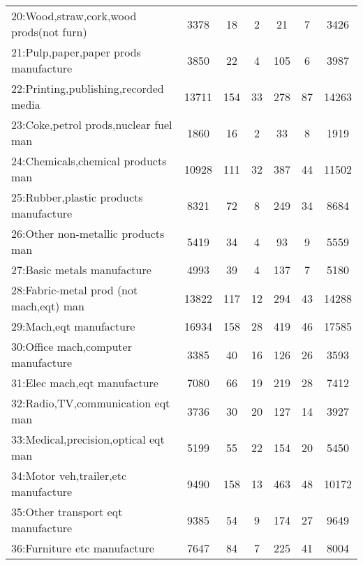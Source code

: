 {\begin{tabular}{l*{6}{c}}
20:Wood,straw,cork,wood prods(not furn)&        3378&          18&           2&          21&           7&        3426\\
21:Pulp,paper,paper prods manufacture&        3850&          22&           4&         105&           6&        3987\\
22:Printing,publishing,recorded media&       13711&         154&          33&         278&          87&       14263\\
23:Coke,petrol prods,nuclear fuel man&        1860&          16&           2&          33&           8&        1919\\
24:Chemicals,chemical products man&       10928&         111&          32&         387&          44&       11502\\
25:Rubber,plastic products manufacture&        8321&          72&           8&         249&          34&        8684\\
26:Other non-metallic products man&        5419&          34&           4&          93&           9&        5559\\
27:Basic metals manufacture&        4993&          39&           4&         137&           7&        5180\\
28:Fabric-metal prod (not mach,eqt) man&       13822&         117&          12&         294&          43&       14288\\
29:Mach,eqt manufacture&       16934&         158&          28&         419&          46&       17585\\
30:Office mach,computer manufacture&        3385&          40&          16&         126&          26&        3593\\
31:Elec mach,eqt manufacture&        7080&          66&          19&         219&          28&        7412\\
32:Radio,TV,communication eqt man&        3736&          30&          20&         127&          14&        3927\\
33:Medical,precision,optical eqt man&        5199&          55&          22&         154&          20&        5450\\
34:Motor veh,trailer,etc manufacture&        9490&         158&          13&         463&          48&       10172\\
35:Other transport eqt manufacture&        9385&          54&           9&         174&          27&        9649\\
36:Furniture etc manufacture&        7647&          84&           7&         225&          41&        8004\\

\end{tabular}}

